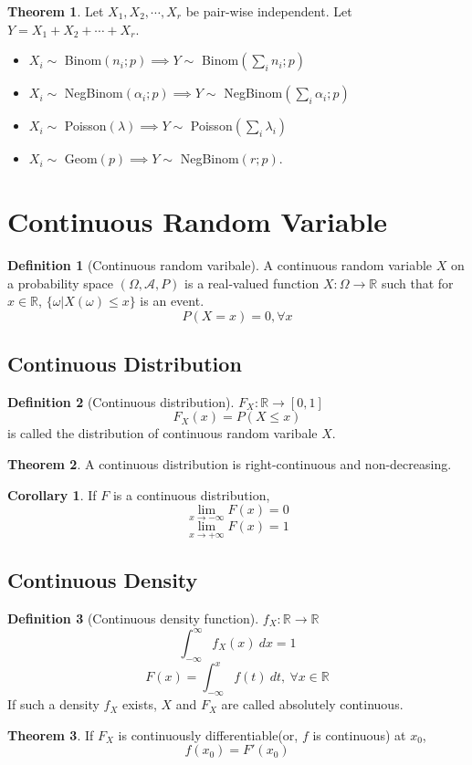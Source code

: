 \documentclass[10pt, a4paper]{extarticle}
\theoremstyle{definition}
\newtheorem{thm}{Theorem}
\newtheorem{cor}{Corollary}[thm]
\newtheorem{defn}{Definition}
\begin{document}
\begin{thm}
	Let $X_1,X_2,\cdots,X_r$ be pair-wise independent. Let $Y=X_1+X_2+\cdots+X_r$.
	\begin{itemize}
		\item $X_i\sim$ Binom$(n_i;p)\implies Y\sim$ Binom$(\sum_i n_i;p)$
		\item $X_i\sim$ NegBinom$(\alpha_i;p)\implies Y\sim$ NegBinom$(\sum_i\alpha_i;p)$
		\item $X_i\sim$ Poisson$(\lambda)\implies Y\sim$ Poisson$(\sum_i\lambda_i)$
		\item $X_i\sim$ Geom$(p)\implies Y\sim$ NegBinom$(r;p)$.
	\end{itemize}
\end{thm}

\section{Continuous Random Variable}
\begin{defn}[Continuous random varibale]
	A continuous random variable $X$ on a probability space $(\Omega,\mathscr{A},P)$ is a real-valued function $X:\Omega\to\mathbb{R}$ such that for $x\in\mathbb{R}$, $\{\omega|X(\omega)\leq x\}$ is an event.
	\[P(X=x)=0,\forall x\]
\end{defn}
\subsection{Continuous Distribution}
\begin{defn}[Continuous distribution]
	$F_X:\mathbb{R}\to[0,1]$
	\[F_X(x)=P(X\leq x)\]
	is called the distribution of continuous random varibale $X$.
\end{defn}
\begin{thm}
	A continuous distribution is right-continuous and non-decreasing.
\end{thm}
\begin{cor}
	If $F$ is a continuous distribution,
	\[\lim_{x\to{-\infty}}F(x)=0\]
	\[\lim_{x\to{+\infty}}F(x)=1\]
\end{cor}
\subsection{Continuous Density}
\begin{defn}[Continuous density function]
	$f_X:\mathbb{R}\to\mathbb{R}$
	\[\int_{-\infty}^\infty f_X(x)\ dx=1\]
	\[F(x)=\int_{-\infty}^x f(t)\ dt,\ \forall x\in\mathbb{R}\]
	If such a density $f_X$ exists, $X$ and $F_X$ are called absolutely continuous.
\end{defn}
\begin{thm}
	If $F_X$ is continuously differentiable(or, $f$ is continuous) at $x_0$,
	\[f(x_0)=F'(x_0)\]
\end{thm}
\end{document}
